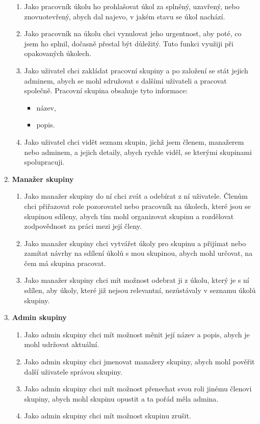 \documentclass[thesis=B,czech]{FITthesis}[2012/06/26]
\begin{document}
\begin{enumerate}
\begin{enumerate}
				\item Jako pracovník úkolu ho prohlašovat úkol za splněný, uzavřený, nebo znovuotevřený, abych dal najevo, v jakém stavu se úkol nachází.
				
				\item Jako pracovník na  úkolu chci vynulovat jeho urgentnost, aby poté, co jsem ho splnil, dočasně přestal být důležitý. Tuto funkci využiji při opakovaných úkolech.
				
				\item Jako uživatel chci zakládat pracovní skupiny a po založení se stát jejich adminem, abych se mohl sdružovat s dalšími uživateli a pracovat společně. Pracovní skupina obsahuje tyto informace:
				\begin{itemize}
					\item název,
					\item popis.
				\end{itemize}
				
				\item Jako uživatel chci vidět seznam skupin, jichž jsem členem, manažerem nebo adminem, a jejich detaily, abych rychle viděl, se kterými skupinami spolupracuji.
			\end{enumerate}
			
			
			\item \textbf{Manažer skupiny}
			\begin{enumerate}
				\item Jako manažer skupiny do ní chci zvát a odebírat z ní uživatele. Členům chci přiřazovat role pozorovatel nebo pracovník na úkolech, které jsou se skupinou sdíleny, abych tím mohl organizovat skupinu a rozdělovat zodpovědnost za práci mezi její členy. 
				
				\item Jako manažer skupiny chci vytvářet úkoly pro skupinu a přijímat nebo zamítat návrhy na sdílení úkolů s mou skupinou, abych mohl určovat, na čem má skupina pracovat.
				
				\item Jako manažer skupiny chci mít možnost odebrat ji z úkolu, který je s ní sdílen, aby úkoly, které již nejsou relevantní, nezůstávaly v seznamu úkolů skupiny.
			\end{enumerate}
			
			
			\item \textbf{Admin skupiny}
			\begin{enumerate}
				\item Jako admin skupiny chci mít možnost měnit její název a popis, abych je mohl udržovat aktuální.
				\item Jako admin skupiny chci jmenovat manažery skupiny, abych mohl pověřit další uživatele správou skupiny.
				\item Jako admin skupiny chci mít možnost přenechat svou roli jinému členovi skupiny, abych mohl skupinu opustit a ta pořád měla admina.
				\item Jako admin skupiny chci mít možnost skupinu zrušit.
			\end{enumerate}
		\end{enumerate}	
		
\end{document}
